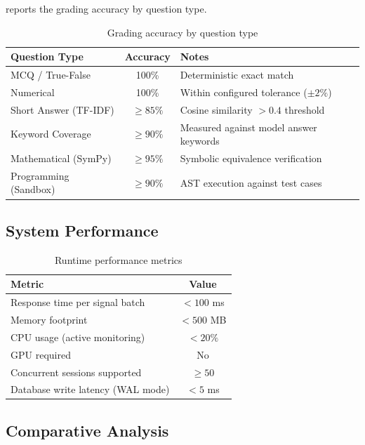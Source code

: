 \documentclass{article}
\begin{document}
 reports the grading accuracy by question type.

\begin{table}[H]
\centering
\caption{Grading accuracy by question type}
\label{tab:grading_accuracy}
\begin{tabular}{l c l}
\toprule
\textbf{Question Type} & \textbf{Accuracy} & \textbf{Notes} \\
\midrule
MCQ / True-False & 100\% & Deterministic exact match \\
Numerical & 100\% & Within configured tolerance ($\pm 2\%$) \\
Short Answer (TF-IDF) & $\geq 85\%$ & Cosine similarity $> 0.4$ threshold \\
Keyword Coverage & $\geq 90\%$ & Measured against model answer keywords \\
Mathematical (SymPy) & $\geq 95\%$ & Symbolic equivalence verification \\
Programming (Sandbox) & $\geq 90\%$ & AST execution against test cases \\
\bottomrule
\end{tabular}
\end{table}

\subsection{System Performance}

\begin{table}[H]
\centering
\caption{Runtime performance metrics}
\label{tab:performance}
\begin{tabular}{l c}
\toprule
\textbf{Metric} & \textbf{Value} \\
\midrule
Response time per signal batch & $< 100$ ms \\
Memory footprint & $< 500$ MB \\
CPU usage (active monitoring) & $< 20\%$ \\
GPU required & No \\
Concurrent sessions supported & $\geq 50$ \\
Database write latency (WAL mode) & $< 5$ ms \\
\bottomrule
\end{tabular}
\end{table}

\subsection{Comparative Analysis}
\end{document}
